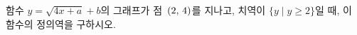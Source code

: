 \hspace*{2mm}\begin{minipage}[t]{\dimexpr\linewidth-2mm\relax}\vspace{0pt}
함수 $y=\sqrt{4x+a}+b$의 그래프가 점~$(2,\mkern3mu 4)$를 지나고, 치역이 $\{y \mid y\ge 2\}$일 때, 이 함수의 정의역을 구하시오. \end{minipage}
